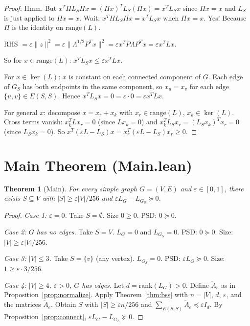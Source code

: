 \documentclass{article}
\newtheorem{theorem}{Theorem}
\theoremstyle{definition}
\begin{document}
\begin{proof}
Hmm. But $x^T \Pi L_S \Pi x = (\Pi x)^T L_S (\Pi x) = x^T L_S x$ since $\Pi x = x$
and $L_S$ is just applied to $\Pi x = x$. Wait: $x^T \Pi L_S \Pi x = x^T L_S x$ when $\Pi x = x$.
Yes! Because $\Pi$ is the identity on $\mathrm{range}(L)$.

RHS $= \varepsilon \|z\|^2 = \varepsilon \|\Lambda^{1/2} P^T x\|^2 = \varepsilon x^T P \Lambda P^T x = \varepsilon x^T L x$.

So for $x \in \mathrm{range}(L)$: $x^T L_S x \le \varepsilon x^T L x$. \checkmark

For $x \in \ker(L)$: $x$ is constant on each connected component of $G$.
Each edge of $G_S$ has both endpoints in the same component, so $x_u = x_v$ for each edge
$\{u,v\} \in E(S,S)$. Hence $x^T L_S x = 0 = \varepsilon \cdot 0 = \varepsilon x^T L x$. \checkmark

For general $x$: decompose $x = x_r + x_k$ with $x_r \in \mathrm{range}(L)$, $x_k \in \ker(L)$.
Cross terms vanish: $x_k^T L x_r = 0$ (since $L x_k = 0$) and
$x_k^T L_S x_r = (L_S x_k)^T x_r = 0$ (since $L_S x_k = 0$).
So $x^T(\varepsilon L - L_S)x = x_r^T(\varepsilon L - L_S)x_r \ge 0$. \checkmark
\end{proof}

\section{Main Theorem (Main.lean)}

\begin{theorem}[Main]
For every simple graph $G = (V,E)$ and $\varepsilon \in [0,1]$, there exists
$S \subseteq V$ with $|S| \ge \varepsilon|V|/256$ and $\varepsilon L_G - L_{G_S} \succeq 0$.
\end{theorem}
\begin{proof}
\emph{Case 1: $\varepsilon = 0$.} Take $S = \emptyset$. Size $0 \ge 0$. PSD: $0 \succeq 0$. \checkmark

\emph{Case 2: $G$ has no edges.} Take $S = V$. $L_G = 0$ and $L_{G_S} = 0$.
PSD: $0 \succeq 0$. Size: $|V| \ge \varepsilon|V|/256$. \checkmark

\emph{Case 3: $|V| \le 3$.} Take $S = \{v\}$ (any vertex). $L_{G_S} = 0$.
PSD: $\varepsilon L_G \succeq 0$. Size: $1 \ge \varepsilon \cdot 3 / 256$. \checkmark

\emph{Case 4: $|V| \ge 4$, $\varepsilon > 0$, $G$ has edges.}
Let $d = \mathrm{rank}(L_G) > 0$. Define $\tilde{A}_e$ as in Proposition~\ref{prop:normalize}.
Apply Theorem~\ref{thm:bss} with $n = |V|$, $d$, $\varepsilon$, and the matrices $\tilde{A}_e$.
Obtain $S$ with $|S| \ge \varepsilon n/256$ and $\sum_{E(S,S)} \tilde{A}_e \preceq \varepsilon I_d$.
By Proposition~\ref{prop:connect}, $\varepsilon L_G - L_{G_S} \succeq 0$. \checkmark
\end{proof}
\end{document}
